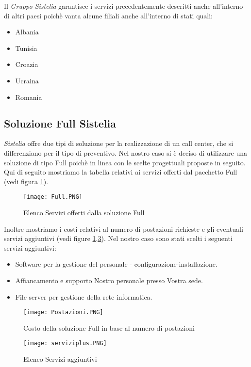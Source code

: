 Il \textit{Gruppo Sistelia} garantisce i servizi precedentemente descritti anche all'interno di altri paesi poichè vanta alcune filiali anche all'interno di stati quali:
\begin{itemize}
\item Albania
\item Tunisia
\item Croazia
\item Ucraina
\item Romania
\end{itemize}

\subsection{Soluzione Full Sistelia}
\textit{Sistelia} offre due tipi di soluzione per la realizzazione di un call center, che si differenziano per il tipo di preventivo.
Nel nostro caso si è deciso di utilizzare una soluzione di tipo Full poichè in linea con le scelte progettuali proposte in seguito. Qui di seguito mostriamo la tabella relativi ai servizi offerti dal pacchetto Full (vedi figura \ref{fig:full}).
\begin{figure}[htbp]
\centering
\texttt{[image: Full.PNG]}
\caption{Elenco Servizi offerti dalla soluzione Full \label{fig:full}}
\end{figure}
Inoltre mostriamo i costi relativi al numero di postazioni richieste e gli eventuali servizi aggiuntivi (vedi figure \ref{fig:full},\ref{fig:serviziplus}).
Nel nostro caso sono stati scelti i seguenti servizi aggiuntivi:
\begin{itemize}
\item Software per la gestione del personale - configurazione-installazione.
\item Affiancamento e supporto Nostro personale presso Vostra sede.
\item File server per gestione della rete informatica.
\end{itemize}
\begin{figure}[htbp]
\centering
\texttt{[image: Postazioni.PNG]}
\caption{Costo della soluzione Full in base al numero di postazioni \label{fig:postazioni}}
\end{figure}
\begin{figure}[htbp]
\centering
\texttt{[image: serviziplus.PNG]}
\caption{Elenco Servizi aggiuntivi  \label{fig:serviziplus}}
\end{figure}


